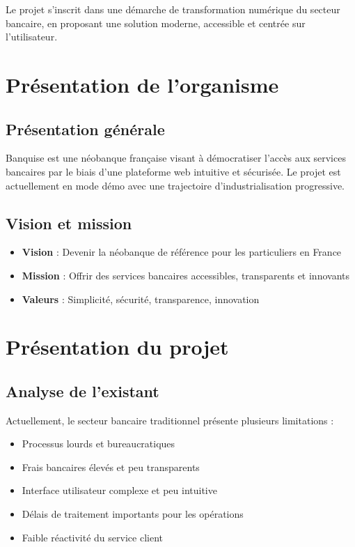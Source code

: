 \documentclass[12pt,a4paper]{report}
\begin{document}
Le projet s'inscrit dans une démarche de transformation numérique du secteur bancaire, en proposant une solution moderne, accessible et centrée sur l'utilisateur.

\section{Présentation de l'organisme}
\subsection{Présentation générale}
Banquise est une néobanque française visant à démocratiser l'accès aux services bancaires par le biais d'une plateforme web intuitive et sécurisée. Le projet est actuellement en mode démo avec une trajectoire d'industrialisation progressive.

\subsection{Vision et mission}
\begin{itemize}[leftmargin=1.5cm]
    \item \textbf{Vision} : Devenir la néobanque de référence pour les particuliers en France
    \item \textbf{Mission} : Offrir des services bancaires accessibles, transparents et innovants
    \item \textbf{Valeurs} : Simplicité, sécurité, transparence, innovation
\end{itemize}

\section{Présentation du projet}

\subsection{Analyse de l'existant}
Actuellement, le secteur bancaire traditionnel présente plusieurs limitations :
\begin{itemize}[leftmargin=1.5cm]
    \item Processus lourds et bureaucratiques
    \item Frais bancaires élevés et peu transparents
    \item Interface utilisateur complexe et peu intuitive
    \item Délais de traitement importants pour les opérations
    \item Faible réactivité du service client
\end{itemize}
\end{document}
